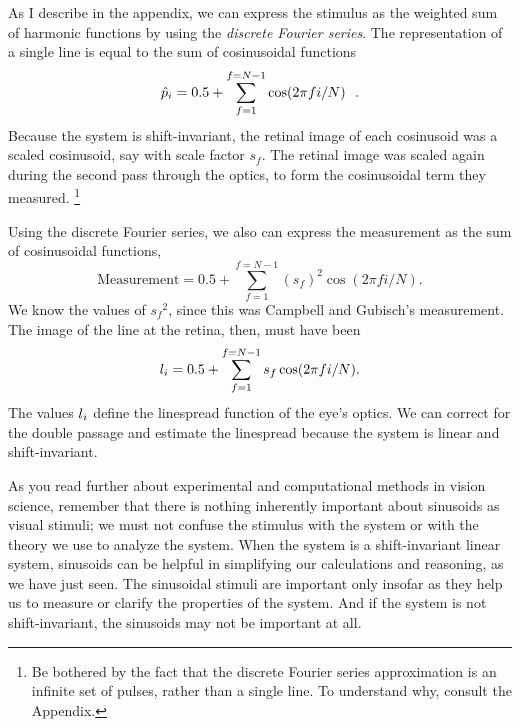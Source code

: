 As I describe in the appendix,
we can express the stimulus as the weighted sum
of harmonic functions by using the {\em discrete Fourier series}.
The representation of a single line
is equal to the sum of cosinusoidal functions
\begin{equation}
\label{e1:lineDFT}
\mbox{$\hat{p}_{i}$} = 0.5 + \sum_{f=1}^{f=N-1} \cos( 2 \pi f {i/N})~~.
\end{equation}
Because the system is shift-invariant, 
the retinal image of each cosinusoid
was a scaled cosinusoid, say with scale factor $s_f$.
The retinal image was
scaled again during the second pass through the optics,
to form the cosinusoidal term they measured.
\footnote{
Be bothered by
the fact that the discrete Fourier series approximation is an infinite
set of pulses, rather than a single line.
To understand why, consult the Appendix.
}

Using the discrete Fourier series, we also 
can express the measurement
as the sum of cosinusoidal functions,
\begin{equation}
\mbox{Measurement} = 0.5 + \sum_{f=1}^{f=N-1} (s_f)^2 \cos( 2 \pi f {i/N}).
\end{equation}
We know the values of ${s_f}^2$, since this was Campbell and Gubisch's
measurement.
The image of the line at the retina, then, must have been
\begin{equation}
\mbox{$l_{i}$} = 0.5 + \sum_{f=1}^{f=N-1} s_f \cos( 2 \pi f {i/N}).
\end{equation}
The values $\mbox{$l_{i}$}$ define the linespread function of the eye's optics.
We can correct for the double passage
and estimate the linespread
because the system is linear and shift-invariant.

As you read further about experimental and computational methods in vision science,
remember that there is nothing inherently important
about sinusoids as visual stimuli;
we must not confuse the stimulus with
the system or with the theory we use to analyze the system.
When the system is a shift-invariant linear system,
sinusoids can be helpful in simplifying our calculations
and reasoning, as we have just seen.
The sinusoidal stimuli are important
only insofar as they help us to measure or clarify
the properties of the system.
And if the system is not shift-invariant,
the sinusoids may not be important at all.

